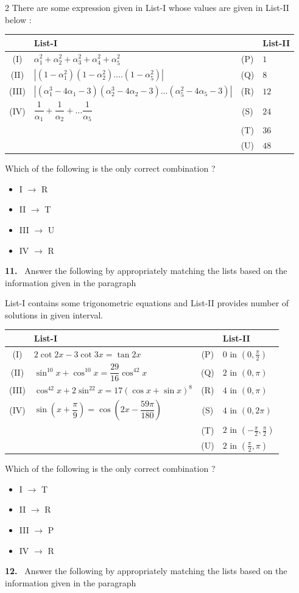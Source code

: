 \documentclass[10pt]{extarticle}
\newcommand{\qn}[1]{\par\smallskip\noindent\textbf{#1.}~}
\newenvironment{qoptions}{\begin{itemize}[leftmargin=1.8em,itemsep=1pt,topsep=2pt,label={}]}{\end{itemize}}
\newcommand{\opt}[2]{\item[(#1)] #2}
\begin{document}
\begin{multicols}{2}
There are some expression given in List-I whose values are given in List-II below :

\begin{center}
{\footnotesize\setlength{\tabcolsep}{2pt}\begin{tabular}{|c|p{4.6cm}|c|p{2.4cm}|}\hline
 & \centering List-I & & \centering List-II\tabularnewline\hline
(I) & $\alpha_1^2+\alpha_2^2+\alpha_3^2+\alpha_4^2+\alpha_5^2$ & (P) & $1$\\\hline
(II) & $|(1-\alpha_1^2)(1-\alpha_2^2)\ldots.(1-\alpha_5^2)|$ & (Q) & $8$\\\hline
(III) & $|(\alpha_1^3-4\alpha_1-3)(\alpha_2^3-4\alpha_2-3)\ldots(\alpha_5^2-4\alpha_5-3)|$ & (R) & $12$\\\hline
(IV) & $\dfrac{1}{\alpha_1}+\dfrac{1}{\alpha_2}+\ldots\dfrac{1}{\alpha_5}$ & (S) & $24$\\\hline
 & & (T) & $36$\\\hline
 & & (U) & $48$\\\hline
\end{tabular}}
\end{center}
Which of the following is the only correct combination ?
\begin{qoptions}
\opt{A}{I $\to$ R}
\opt{B}{II $\to$ T}
\opt{C}{III $\to$ U}
\opt{D}{IV $\to$ R}
\end{qoptions}
\qn{11} Answer the following by appropriately matching the lists based on the information given in the paragraph

List-I contains some trigonometric equations and List-II provides number of solutions in given interval.

\begin{center}
{\footnotesize\setlength{\tabcolsep}{2pt}\begin{tabular}{|c|p{4.6cm}|c|p{2.4cm}|}\hline
 & \centering List-I & & \centering List-II\tabularnewline\hline
(I) & $2\cot2x-3\cot3x=\tan2x$ & (P) & $0$ in $\left(0,\frac\pi2\right)$\\\hline
(II) & $\sin^{10}x+\cos^{10}x=\dfrac{29}{16}\cos^42x$ & (Q) & $2$ in $(0,\pi)$\\\hline
(III) & $\cos^42x+2\sin^22x=17(\cos x+\sin x)^8$ & (R) & $4$ in $(0,\pi)$\\\hline
(IV) & $\sin\left(x+\dfrac\pi9\right)=\cos\left(2x-\dfrac{59\pi}{180}\right)$ & (S) & $4$ in $(0,2\pi)$\\\hline
 & & (T) & $2$ in $\left(-\frac\pi2,\frac\pi2\right)$\\\hline
 & & (U) & $2$ in $\left(\frac\pi2,\pi\right)$\\\hline
\end{tabular}}
\end{center}
Which of the following is the only correct combination ?
\begin{qoptions}
\opt{A}{I $\to$ T}
\opt{B}{II $\to$ R}
\opt{C}{III $\to$ P}
\opt{D}{IV $\to$ R}
\end{qoptions}
\qn{12} Answer the following by appropriately matching the lists based on the information given in the paragraph


\end{multicols}
\end{document}
